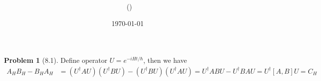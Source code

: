 \documentclass[twoside,11pt]{article}
\title{{\lms \Code \ \Ass}}
\author{\lms \name \ (\href{mailto:\mail}{\mail})}
\date{\sffamily \today}
\makeatletter
\theoremstyle{definition}
\newtheorem{problem}{Problem}
\theoremstyle{remark}
\newtheorem*{remark}{Remark}
\renewcommand{\maketitle}{\bgroup\setlength{\parindent}{0pt}
\begin{flushleft}
  \textbf{\Large\@title}

  \@author
\end{flushleft}\egroup
}
\makeatother
\begin{document}
\maketitle
\thispagestyle{title}



\begin{problem}[8.1]
Define operator $U=e^{-iHt/\hbar}$, then we have
\begin{align*}
    A_HB_H - B_HA_H &= (U^\dagger AU)(U^\dagger BU) - 
    (U^\dagger BU)(U^\dagger AU) = 
    U^\dagger AB U - U^\dagger BA U 
    = U^\dagger [A, B] U = C_H
\end{align*}
\end{problem}
\end{document}
